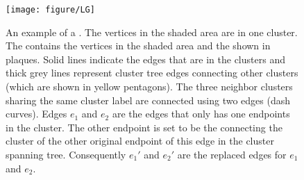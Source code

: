 \begin{figure}
\centering
  \texttt{[image: figure/LG]}
  \vspace{-1em}
  \caption{An example of a \localgraph{}.  The vertices in the shaded area are in one cluster.  The \localgraph{} contains the vertices in the shaded area and the \outvers{} shown in plaques.  Solid lines indicate the edges that are in the clusters and thick grey lines represent cluster tree edges connecting other clusters (which are shown in yellow pentagons).  The three neighbor clusters sharing the same cluster label are connected using two edges (dash curves).  Edges $e_1$ and $e_2$ are the edges that only has one endpoints in the cluster.  The other endpoint is set to be the \outver{} connecting the cluster of the other original endpoint of this edge in the cluster spanning tree.  Consequently $e_1'$ and $e_2'$ are the replaced edges for $e_1$ and $e_2$.
  }\label{fig:localgraph}
\end{figure}

